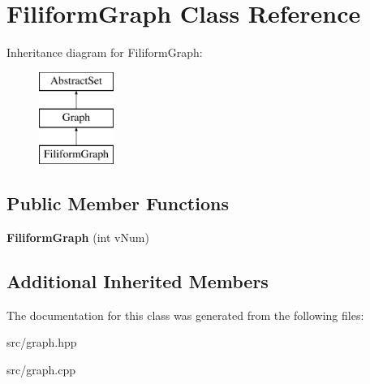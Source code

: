 \hypertarget{classFiliformGraph}{\section{Filiform\-Graph Class Reference}
\label{classFiliformGraph}
}
Inheritance diagram for Filiform\-Graph\-:\begin{figure}[H]
\begin{center}
\leavevmode
\includegraphics[height=3.000000cm]{classFiliformGraph}
\end{center}
\end{figure}
\subsection*{Public Member Functions}
\begin{DoxyCompactItemize}
\item 
\hypertarget{classFiliformGraph_a78e5ddfddf9f546254cb9430bb1aaccf}{{\bfseries Filiform\-Graph} (int v\-Num)}\label{classFiliformGraph_a78e5ddfddf9f546254cb9430bb1aaccf}

\end{DoxyCompactItemize}
\subsection*{Additional Inherited Members}


The documentation for this class was generated from the following files\-:\begin{DoxyCompactItemize}
\item 
src/graph.\-hpp\item 
src/graph.\-cpp\end{DoxyCompactItemize}
